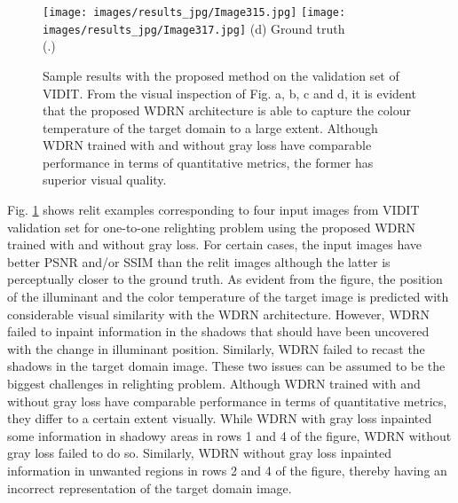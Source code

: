 \documentclass[runningheads]{llncs}
\begin{document}
\begin{figure}
\begin{minipage}{\x\linewidth}
\begin{center}
		\vskip 2pt
		\texttt{[image: images/results\_jpg/Image315.jpg]}
		\fontsize{8}{12pt}
		\vskip 2pt
        \vskip 2pt
        \texttt{[image: images/results\_jpg/Image317.jpg]}
        \fontsize{8}{12pt}
        \vskip 2pt
		\fontsize{9}{12pt}\selectfont (d) Ground truth \\ {\color{white} (.)}
		\end{center}
  \end{minipage}
\caption{Sample results with the proposed method on the validation set of VIDIT. From the visual inspection of Fig. a, b, c and d, it is evident that the proposed WDRN architecture is able to capture the colour temperature of the target domain to a large extent. Although WDRN trained with and without gray loss have comparable performance in terms of quantitative metrics, the former has superior visual quality.}
\label{fig:sample_results_one-one-relight}
\end{figure}

Fig. \ref{fig:sample_results_one-one-relight} shows relit examples corresponding to four input images from VIDIT validation set for one-to-one relighting problem using the proposed WDRN trained with and without gray loss. For certain cases, the input images have better PSNR and/or SSIM than the relit images although the latter is perceptually closer to the ground truth. As evident from the figure, the position of the illuminant  and the color temperature  of the target image is predicted with considerable visual similarity with the WDRN architecture. However, WDRN failed to inpaint information in the shadows that should have been uncovered with the change in illuminant position. Similarly, WDRN failed to recast the shadows in the target domain image. These two issues can be assumed to be the biggest challenges in relighting problem. Although WDRN trained with and without gray loss have comparable performance in terms of quantitative metrics, they differ to a certain extent visually. While WDRN with gray loss inpainted some information in shadowy areas in rows 1 and 4 of the figure, WDRN without gray loss failed to do so. Similarly, WDRN without gray loss inpainted information in unwanted regions in rows 2 and 4 of the figure, thereby having an incorrect representation of the target domain image.
\end{document}
